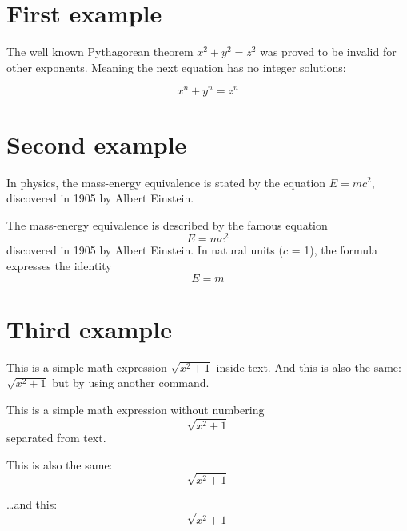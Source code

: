 \documentclass{article}
\begin{document}
\section{First example}

The well known Pythagorean theorem \(x^2 + y^2 = z^2\) was 
proved to be invalid for other exponents. 
Meaning the next equation has no integer solutions:

\[ x^n + y^n = z^n \]



\section{Second example}

In physics, the mass-energy equivalence is stated by the equation $E=mc^2$, discovered in 1905 by Albert Einstein.

The mass-energy equivalence is described by the famous equation
$$E=mc^2$$
discovered in 1905 by Albert Einstein. 
In natural units ($c$ = 1), the formula expresses the identity
\begin{equation}
E=m
\end{equation}

\section{Third example}

This is a simple math expression \(\sqrt{x^2+1}\) inside text. 
And this is also the same: 
\begin{math}
\sqrt{x^2+1}
\end{math}
but by using another command.

This is a simple math expression without numbering
\[\sqrt{x^2+1}\] 
separated from text.

This is also the same:
\begin{displaymath}
\sqrt{x^2+1}
\end{displaymath}

\ldots and this:
\begin{equation*}
\sqrt{x^2+1}
\end{equation*}
\end{document}

